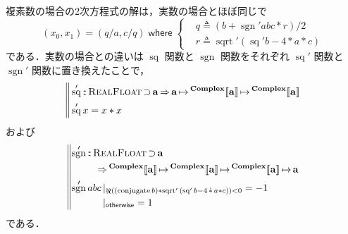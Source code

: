 \documentclass[a5paper,twoside,fleqn,draft]{jsbook}
\def\[{[\![}
\def\]{]\!]}
\DeclareMathOperator{\sgn}{sgn}
\newcommand{\mBrace}{\Vert}
\newcommand{\mKeyword}[1]{\mathsf{#1}}
\newcommand{\mOtherwiseKeyword}{\mKeyword{otherwise}}
\newcommand{\mWhereKeyword}{\mKeyword{where}}
\DeclareMathOperator{\mOtherwise}{\mOtherwiseKeyword}
\DeclareMathOperator{\mSuperClass}{\Rightarrow}
\DeclareMathOperator{\mSuperSet}{\supset}
\DeclareMathOperator{\mWhere}{\mWhereKeyword}
\newcommand{\mSpecialFunc}[1]{#1}
\DeclareMathOperator{\mConjugate}{\mSpecialFunc{conjugate}}
\DeclareMathOperator{\mRealPart}{\Re}
\DeclareMathOperator{\mSq}{\mSpecialFunc{sq}}
\DeclareMathOperator{\mSqrt}{\mSpecialFunc{sqrt}}
\DeclareMathOperator{\mComplexTimes}{\Dot\ast}
\DeclareMathOperator{\mIn}{{:\!:}}
\DeclareMathOperator{\mLetEq}{\triangleq}
\DeclareMathOperator{\mMapsTo}{\mapsto}
\newcommand{\mType}[1]{\mathbf{#1}} %
\newcommand{\mA}{\mType{a}}
\newcommand{\mTypeAssemble}[2]{{}^{\mType{#1}}\[\mType{#2}\]}
\newcommand{\mComplexType}[1]{\mTypeAssemble{Complex}{#1}}
\newcommand{\mTypeClass}[1]{\textsc{#1}} %
\newcommand{\mRealFloatTypeClass}{\mTypeClass{RealFloat}}
\newcommand{\mGuard}[1]{\mathop{\mid_{#1}}}
\begin{document}
複素数の場合の2次方程式の解は，実数の場合とほぼ同じで
\begin{equation}
  (x_0,x_1)=(q/a,c/q)\mWhere\left\{
  \begin{aligned}
    &q\mLetEq\left(b+\sgn'abc*r\right)/2\\
    &r\mLetEq\mSqrt'{(\mSq'b-4*a*c)}
  \end{aligned}
  \right.
\end{equation}
である．実数の場合との違いは $\mSq$ 関数と $\sgn$ 関数をそれぞれ
$\mSq'$ 関数と $\sgn'$ 関数に置き換えたことで，
\begin{equation}
  \left\mBrace
  \begin{aligned}
    &\mSq'
    \mIn\mRealFloatTypeClass\mSuperSet\mA
    \mSuperClass\mA
    \mMapsTo\mComplexType{a}
    \mMapsTo\mComplexType{a}\\
    &\mSq'x
    =x*x
  \end{aligned}
  \right.
\end{equation}
および
\begin{equation}
  \left\mBrace
  \begin{aligned}
    &\begin{aligned}
       \sgn'
       &\mIn\mRealFloatTypeClass\mSuperSet\mA\\
       &\quad\mSuperClass\mComplexType{a}
       \mMapsTo\mComplexType{a}
       \mMapsTo\mComplexType{a}
       \mMapsTo\mA
     \end{aligned}\\
    &\begin{aligned}
       \sgn'abc
       &\mGuard{\mRealPart((\mConjugate b)*\mSqrt'{(\mSq' b-4\mComplexTimes a*c)})<0}
       =-1\\
       &\mGuard{\mOtherwise}
       =1
     \end{aligned}
  \end{aligned}
  \right.
\end{equation}
である．
\end{document}
